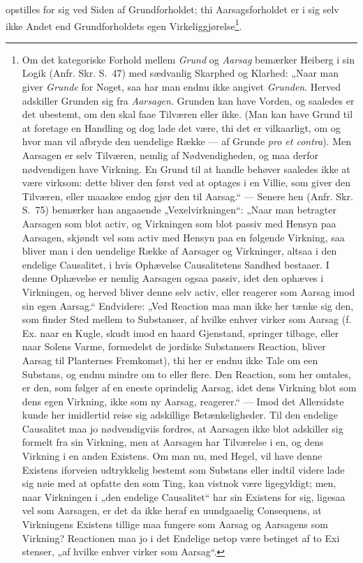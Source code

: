 \documentclass[11pt]{book}
\begin{document}
opstilles for sig ved Siden af Grundforholdet; thi Aarsagsforholdet er i
sig selv ikke Andet end Grundforholdets egen
Virkeliggjørelse\footnote{Om det kategoriske Forhold mellem
\emph{Grund} og \emph{Aarsag} bemærker Heiberg i sin Logik (Anfr. Skr.
S.\ 47) med sædvanlig Skarphed og Klarhed: „Naar man giver \emph{Grunde}
for Noget, saa har man endnu ikke angivet \emph{Grunden}. Herved
adskiller Grunden sig fra \emph{Aarsagen}. Grunden kan have Vorden, og
saaledes er det ubestemt, om den skal faae Tilværen eller ikke. (Man kan
have Grund til at foretage en Handling og dog lade det være, thi det er
vilkaarligt, om og hvor man vil afbryde den uendelige Række --- af Grunde
\textit{pro et contra}). Men Aarsagen er selv Tilværen, nemlig af
Nødvendigheden, og maa derfor nødvendigen have Virkning. En Grund til at
handle behøver saaledes ikke at være virksom: dette bliver den først ved
at optages i en Villie, som giver den Tilværen, eller maaskee endog gjør
den til Aarsag.“ --- Senere hen (Anfr. Skr. S.\ 75) bemærker han
angaaende „Vexelvirkningen“: „Naar man betragter Aarsagen som blot activ,
og Virkningen som blot passiv med Hensyn paa Aarsagen, skjøndt vel som
activ med Hensyn paa en følgende Virkning, saa bliver man
i den uendelige Række af Aarsager og Virkninger, altsaa i den endelige
Causalitet, i hvis Ophævelse Causalitetens Sandhed bestaaer. I denne
Ophævelse er nemlig Aarsagen ogsaa passiv, idet den ophæves i
Virkningen, og herved bliver denne selv activ, eller reagerer som Aarsag
imod sin egen Aarsag.“ Endvidere: „Ved Reaction maa man ikke her tænke
sig den, som finder Sted mellem to Substanser, af hvilke enhver virker
som Aarsag (f. Ex. naar en Kugle, skudt imod en haard Gjenstand, springer
tilbage, eller naar Solens Varme, formedelst de jordiske Substansers
Reaction, bliver Aarsag til Planternes Fremkomst), thi her er endnu ikke
Tale om een Substans, og endnu mindre om to eller flere. Den Reaction,
som her omtales, er den, som følger af en eneste oprindelig Aarsag, idet
dens Virkning blot som dens egen Virkning, ikke som ny Aarsag,
reagerer.“ --- Imod det Allersidste kunde her imidlertid reise sig
adskillige Betænkeligheder. Til den endelige Causalitet maa jo
nødvendigviis fordres, at Aarsagen ikke blot adskiller sig formelt fra
sin Virkning, men at Aarsagen har Tilværelse i en, og dens Virkning i en
anden Existens. Om man nu, med Hegel, vil have denne Existens iforveien
udtrykkelig bestemt som Substans eller indtil videre lade sig nøie med at
opfatte den som Ting, kan vistnok være ligegyldigt; men, naar Virkningen
i „den endelige Causalitet“ har sin Existens for sig, ligesaa vel som
Aarsagen, er det da ikke heraf en uundgaaelig Consequens, at Virkningens
Existens tillige maa fungere som Aarsag og Aarsagens som Virkning?
Reactionen maa jo i det Endelige netop være betinget af to
Exi\-%
stenser, „af hvilke enhver virker som Aarsag“.}.
\end{document}
